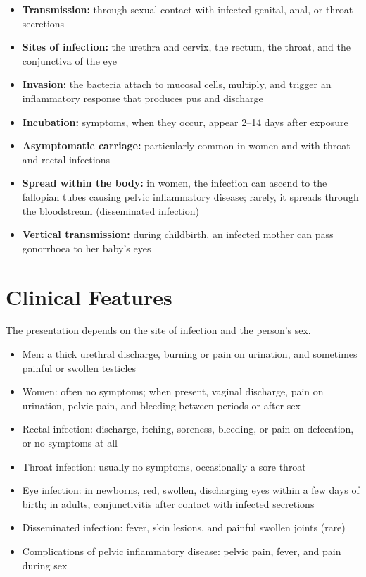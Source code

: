 \begin{itemize}
    \item \textbf{Transmission:} through sexual contact with infected genital, anal, or throat secretions
    \item \textbf{Sites of infection:} the urethra and cervix, the rectum, the throat, and the conjunctiva of the eye
    \item \textbf{Invasion:} the bacteria attach to mucosal cells, multiply, and trigger an inflammatory response that produces pus and discharge
    \item \textbf{Incubation:} symptoms, when they occur, appear 2--14 days after exposure
    \item \textbf{Asymptomatic carriage:} particularly common in women and with throat and rectal infections
    \item \textbf{Spread within the body:} in women, the infection can ascend to the fallopian tubes causing pelvic inflammatory disease; rarely, it spreads through the bloodstream (disseminated infection)
    \item \textbf{Vertical transmission:} during childbirth, an infected mother can pass gonorrhoea to her baby's eyes
\end{itemize}

\section*{Clinical Features}
The presentation depends on the site of infection and the person's sex.

\begin{itemize}
    \item Men: a thick urethral discharge, burning or pain on urination, and sometimes painful or swollen testicles
    \item Women: often no symptoms; when present, vaginal discharge, pain on urination, pelvic pain, and bleeding between periods or after sex
    \item Rectal infection: discharge, itching, soreness, bleeding, or pain on defecation, or no symptoms at all
    \item Throat infection: usually no symptoms, occasionally a sore throat
    \item Eye infection: in newborns, red, swollen, discharging eyes within a few days of birth; in adults, conjunctivitis after contact with infected secretions
    \item Disseminated infection: fever, skin lesions, and painful swollen joints (rare)
    \item Complications of pelvic inflammatory disease: pelvic pain, fever, and pain during sex
\end{itemize}

